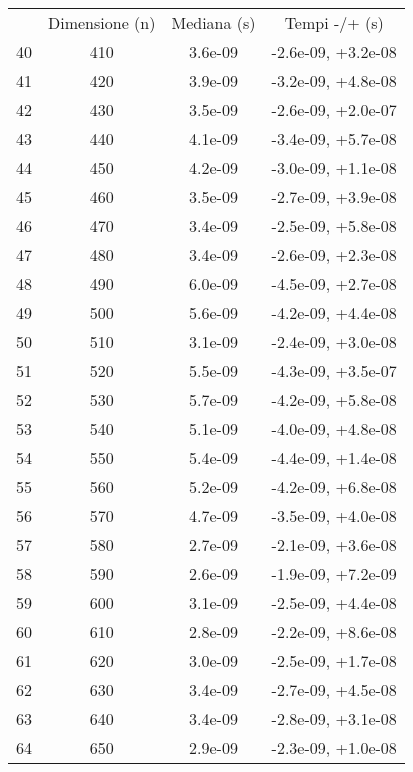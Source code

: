 \begin{table}
\centering
\begin{adjustbox}{width=1\textwidth/2}
\begin{tabular}{|c|c|c|c|}
\hline
 & Dimensione (n) & Mediana (s) & Tempi -/+ (s) \\
40 & 410 & 3.6e-09 & -2.6e-09, +3.2e-08 \\
\cline{1-4}
41 & 420 & 3.9e-09 & -3.2e-09, +4.8e-08 \\
\cline{1-4}
42 & 430 & 3.5e-09 & -2.6e-09, +2.0e-07 \\
\cline{1-4}
43 & 440 & 4.1e-09 & -3.4e-09, +5.7e-08 \\
\cline{1-4}
44 & 450 & 4.2e-09 & -3.0e-09, +1.1e-08 \\
\cline{1-4}
45 & 460 & 3.5e-09 & -2.7e-09, +3.9e-08 \\
\cline{1-4}
46 & 470 & 3.4e-09 & -2.5e-09, +5.8e-08 \\
\cline{1-4}
47 & 480 & 3.4e-09 & -2.6e-09, +2.3e-08 \\
\cline{1-4}
48 & 490 & 6.0e-09 & -4.5e-09, +2.7e-08 \\
\cline{1-4}
49 & 500 & 5.6e-09 & -4.2e-09, +4.4e-08 \\
\cline{1-4}
50 & 510 & 3.1e-09 & -2.4e-09, +3.0e-08 \\
\cline{1-4}
51 & 520 & 5.5e-09 & -4.3e-09, +3.5e-07 \\
\cline{1-4}
52 & 530 & 5.7e-09 & -4.2e-09, +5.8e-08 \\
\cline{1-4}
53 & 540 & 5.1e-09 & -4.0e-09, +4.8e-08 \\
\cline{1-4}
54 & 550 & 5.4e-09 & -4.4e-09, +1.4e-08 \\
\cline{1-4}
55 & 560 & 5.2e-09 & -4.2e-09, +6.8e-08 \\
\cline{1-4}
56 & 570 & 4.7e-09 & -3.5e-09, +4.0e-08 \\
\cline{1-4}
57 & 580 & 2.7e-09 & -2.1e-09, +3.6e-08 \\
\cline{1-4}
58 & 590 & 2.6e-09 & -1.9e-09, +7.2e-09 \\
\cline{1-4}
59 & 600 & 3.1e-09 & -2.5e-09, +4.4e-08 \\
\cline{1-4}
60 & 610 & 2.8e-09 & -2.2e-09, +8.6e-08 \\
\cline{1-4}
61 & 620 & 3.0e-09 & -2.5e-09, +1.7e-08 \\
\cline{1-4}
62 & 630 & 3.4e-09 & -2.7e-09, +4.5e-08 \\
\cline{1-4}
63 & 640 & 3.4e-09 & -2.8e-09, +3.1e-08 \\
\cline{1-4}
64 & 650 & 2.9e-09 & -2.3e-09, +1.0e-08 \\

\end{tabular}
\end{adjustbox}
\end{table}
